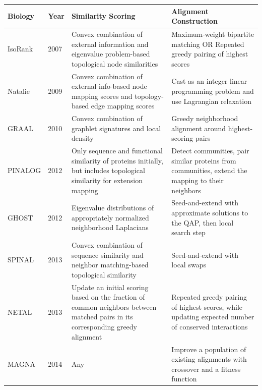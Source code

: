 \documentclass[12pt]{thesis}
\theoremstyle{plain}
\theoremstyle{definition}
\theoremstyle{remark}
\begin{document}
\begin{table}[!hp]
\centering
{\setlength\extrarowheight{3pt}\fontsize{11}{13}\selectfont
\begin{tabular}{|L{0.2\textwidth}|L{0.055\textwidth}|L{0.33\textwidth}|L{0.31\textwidth}|}
\hline
\textbf{Biology} & \textbf{Year} & \textbf{Similarity Scoring} & \textbf{Alignment Construction} \\ \hline
IsoRank \cite{Singh_2007} & 2007 & Convex combination of external information and eigenvalue problem-based topological node similarities  & Maximum-weight bipartite matching OR Repeated greedy pairing of highest scores \\ \hline

Natalie \cite{Klau_2009} & 2009 & Convex combination of external info-based node mapping scores and topology-based edge mapping scores & Cast as an integer linear programming problem and use Lagrangian relaxation \\ \hline

GRAAL \cite{Kuchaiev_2010} & 2010 & Convex combination of graphlet signatures and local density & Greedy neighborhood alignment around highest-scoring pairs \\ \hline

PINALOG \cite{phan2012pinalog} & 2012 & Only sequence and functional similarity of proteins initially, but includes topological similarity for extension mapping & Detect communities, pair similar proteins from communities, extend the mapping to their neighbors  \\ \hline

GHOST \cite{Patro_2012} & 2012 & Eigenvalue distributions of appropriately normalized neighborhood Laplacians & Seed-and-extend with approximate solutions to the QAP, then local search step \\ \hline

SPINAL \cite{aladaug2013spinal} & 2013 & Convex combination of sequence similarity and neighbor matching-based topological similarity  & Seed-and-extend with local swaps \\ \hline

NETAL \cite{Neyshabur_2013} & 2013 & Update an initial scoring based on the fraction of common neighbors between matched pairs in its corresponding greedy alignment & Repeated greedy pairing of highest scores, while updating expected number of conserved interactions \\ \hline

MAGNA \cite{Saraph_2014} & 2014 & Any & Improve a population of existing alignments with crossover and a fitness function \\ \hline


\end{tabular}}
\end{table}
\end{document}
